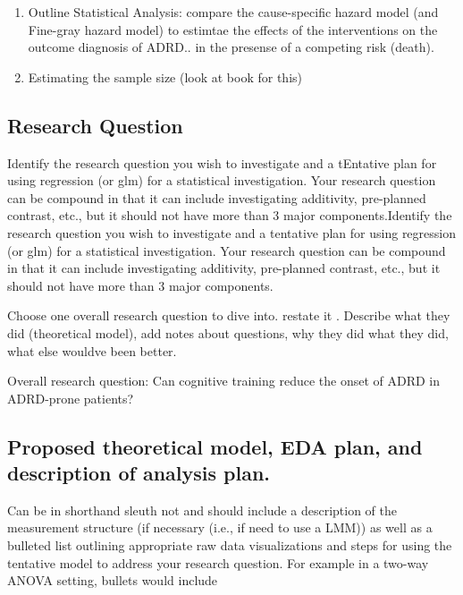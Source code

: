 \documentclass[11pt]{article}
\begin{document}
\begin{enumerate}
\begin{enumerate}
\item Wait a long time, perform booster training if the subject was assigned to booster.
\item Link data to Medicare data to get a better idea of the long term effects of the cognitive training intervention
\end{enumerate}
\item Outline Statistical Analysis: compare the cause-specific hazard model (and Fine-gray hazard model) to estimtae the effects of the interventions on the outcome diagnosis of ADRD.. in the presense of a competing risk (death).
\item Estimating the sample size (look at book for this)
\end{enumerate}


\subsection{Research Question}
\label{sec:org500612e}

Identify the research question you wish to investigate and a tEntative plan for using regression (or glm) for a statistical investigation. Your research question can be compound in that it can include investigating additivity, pre-planned contrast, etc., but it should not have more than 3 major components.Identify the research question you wish to investigate and a tentative plan for using regression (or glm) for a statistical investigation. Your research question can be compound in that it can include investigating additivity, pre-planned contrast, etc., but it should not have more than 3 major components.

Choose one overall research question to dive into. restate it . Describe what they did (theoretical model), add notes about questions, why they did what they did, what else wouldve been better.

Overall research question: Can cognitive training reduce the onset of ADRD in ADRD-prone patients?

\subsection{Proposed theoretical model, EDA plan, and description of analysis plan.}
\label{sec:orgbf33aa1}

Can be in shorthand sleuth not and should include a description of the measurement structure (if necessary (i.e., if need to use a LMM)) as well as a bulleted list outlining appropriate raw data visualizations and steps for using the tentative model to address your research question. For example in a two-way ANOVA setting, bullets would include
\end{document}
